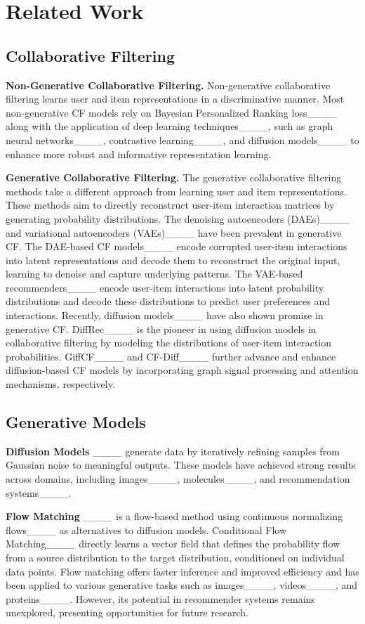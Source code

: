 \section{Related Work}
\subsection{Collaborative Filtering}

\noindent \textbf{Non-Generative Collaborative Filtering.}
Non-generative collaborative filtering learns user and item representations in a discriminative manner. Most non-generative CF models rely on Bayesian Personalized Ranking loss____ along with the application of deep learning techniques____, such as graph neural networks____, contrastive learning____, and diffusion models____ to enhance more robust and informative representation learning.

\noindent \textbf{Generative Collaborative Filtering.}
The generative collaborative filtering methods take a different approach from learning user and item representations. These methods aim to directly reconstruct user-item interaction matrices by generating probability distributions. The denoising autoencoders (DAEs)____ and variational autoencoders (VAEs)____ have been prevalent in generative CF. The DAE-based CF models____ encode corrupted user-item interactions into latent representations and decode them to reconstruct the original input, learning to denoise and capture underlying patterns. The VAE-based recommenders____ encode user-item interactions into latent probability distributions and decode these distributions to predict user preferences and interactions.
Recently, diffusion models____ have also shown promise in generative CF. DiffRec____ is the pioneer in using diffusion models in collaborative filtering by modeling the distributions of user-item interaction probabilities. GiffCF____ and CF-Diff____ further advance and enhance diffusion-based CF models by incorporating graph signal processing and attention mechanisms, respectively.

\vspace{-3pt}
\subsection{Generative Models}

\noindent \textbf{Diffusion Models}  
____ generate data by iteratively refining samples from Gaussian noise to meaningful outputs. These models have achieved strong results across domains, including images____, molecules____, and recommendation systems____. 

\noindent \textbf{Flow Matching}
____ is a flow-based method using continuous normalizing flows____ as alternatives to diffusion models. Conditional Flow Matching____ directly learns a vector field that defines the probability flow from a source distribution to the target distribution, conditioned on individual data points. Flow matching offers faster inference and improved efficiency and has been applied to various generative tasks such as images____, videos____, and proteins____. However, its potential in recommender systems remains unexplored, presenting opportunities for future research.  

\vspace{-2pt}